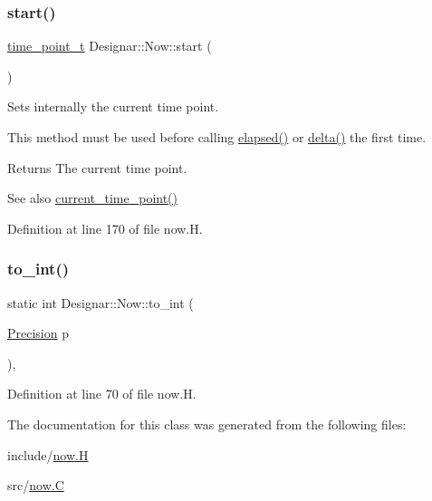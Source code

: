 \subsubsection{\texorpdfstring{start()}{start()}}
{\footnotesize\ttfamily \hyperlink{namespace_designar_a0edbd598eadb672df2c70e5af4dfccee}{time\+\_\+point\+\_\+t} Designar\+::\+Now\+::start (\begin{DoxyParamCaption}{ }\end{DoxyParamCaption})\hspace{0.3cm}{\ttfamily [inline]}}

Sets internally the current time point.

This method must be used before calling \hyperlink{class_designar_1_1_now_a3219d85172fc9628ef90f66c1d69a8e0}{elapsed()} or \hyperlink{class_designar_1_1_now_ae2a46a7ff8392fbadc9fb28ee17f7f5a}{delta()} the first time.

\begin{DoxyReturn}{Returns}
The current time point. 
\end{DoxyReturn}
\begin{DoxySeeAlso}{See also}
\hyperlink{class_designar_1_1_now_af862bb15a2202e02e31a1d11fac08dcf}{current\+\_\+time\+\_\+point()} 
\end{DoxySeeAlso}


Definition at line 170 of file now.\+H.

\mbox{\label{class_designar_1_1_now_a24c5b1e6f6d2e7d8030fd4b70a9a1b12}} 
\subsubsection{\texorpdfstring{to\+\_\+int()}{to\_int()}}
{\footnotesize\ttfamily static int Designar\+::\+Now\+::to\+\_\+int (\begin{DoxyParamCaption}\item[{\hyperlink{class_designar_1_1_now_a3c9f5e57907c88cbe63c70a64638c072}{Precision}}]{p }\end{DoxyParamCaption})\hspace{0.3cm}{\ttfamily [inline]}, {\ttfamily [static]}}



Definition at line 70 of file now.\+H.



The documentation for this class was generated from the following files\+:\begin{DoxyCompactItemize}
\item 
include/\hyperlink{now_8_h}{now.\+H}\item 
src/\hyperlink{now_8_c}{now.\+C}\end{DoxyCompactItemize}
